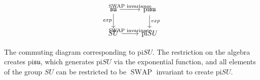 \documentclass{article}
\begin{document}
\[
\begin{tikzcd}
\mathfrak{su} \arrow[r, "\text{SWAP invariance}"] \arrow[d, "exp"'] & \text{pi}\mathfrak{su} \arrow[d, "exp"] \\
SU \arrow[r, "\text{SWAP invariance}"] & \text{pi}SU
\end{tikzcd}
\]

The commuting diagram corresponding to $\text{pi}SU$. The restriction on the algebra creates $\text{pi}\mathfrak{su}$, which generates $\text{pi}SU$ via the exponential function, and all elements of the group $SU$ can be restricted to be $\operatorname{SWAP}$ invariant to create $\text{pi}SU$.
\end{document}
